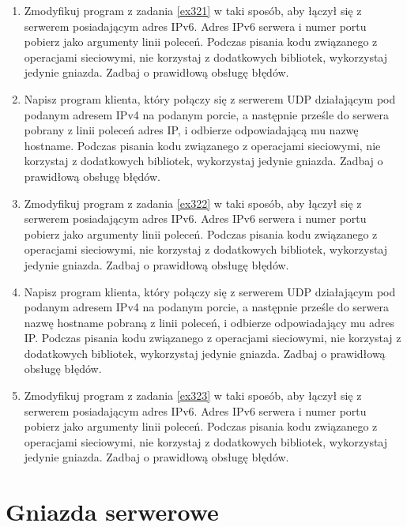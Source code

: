 \documentclass{article}
\begin{document}
\begin{enumerate}[label=\textbf{3.\arabic*}, resume]
\item  Zmodyfikuj program z zadania \ref{ex321} w taki sposób,  aby łączył się z serwerem posiadającym adres IPv6. Adres IPv6 serwera i numer portu pobierz jako argumenty linii poleceń. Podczas pisania kodu związanego z operacjami sieciowymi, nie korzystaj z dodatkowych bibliotek, wykorzystaj jedynie gniazda. Zadbaj o prawidłową obsługę błędów. 

\item \label{ex322} Napisz program klienta, który połączy się z serwerem UDP działającym pod podanym adresem IPv4 na podanym porcie, a następnie prześle do serwera pobrany z linii poleceń adres IP, i odbierze odpowiadającą mu nazwę hostname. Podczas pisania kodu związanego z operacjami sieciowymi, nie korzystaj z dodatkowych bibliotek, wykorzystaj jedynie gniazda. Zadbaj o prawidłową obsługę błędów. 

\item  Zmodyfikuj program z zadania \ref{ex322} w taki sposób,  aby łączył się z serwerem posiadającym adres IPv6. Adres IPv6 serwera i numer portu pobierz jako argumenty linii poleceń. Podczas pisania kodu związanego z operacjami sieciowymi, nie korzystaj z dodatkowych bibliotek, wykorzystaj jedynie gniazda. Zadbaj o prawidłową obsługę błędów. 

\item \label{ex323} Napisz program klienta, który połączy się z serwerem UDP działającym pod podanym adresem IPv4 na podanym porcie, a następnie prześle do serwera nazwę hostname pobraną z linii poleceń, i odbierze odpowiadający mu adres IP.  Podczas pisania kodu związanego z operacjami sieciowymi, nie korzystaj z dodatkowych bibliotek, wykorzystaj jedynie gniazda. Zadbaj o prawidłową obsługę błędów. 

\item Zmodyfikuj program z zadania \ref{ex323} w taki sposób,  aby łączył się z serwerem posiadającym adres IPv6. Adres IPv6 serwera i numer portu pobierz jako argumenty linii poleceń. Podczas pisania kodu związanego z operacjami sieciowymi, nie korzystaj z dodatkowych bibliotek, wykorzystaj jedynie gniazda. Zadbaj o prawidłową obsługę błędów. 
\end{enumerate}


\newpage
\section{Gniazda serwerowe}


\newpage
\end{document}
